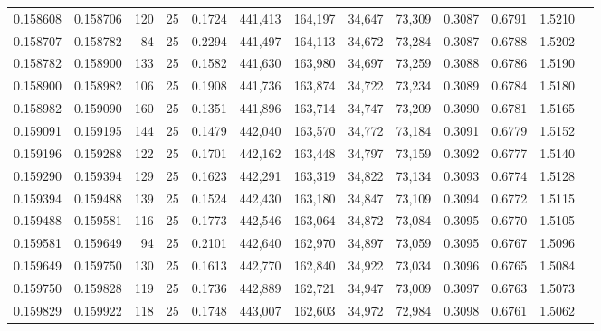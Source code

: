 \begin{tabular}{rrrrrrrrrrrrr}
0.158608 & 0.158706 &   120 &  25 &                                     0.1724 & 441,413 & 164,197 &  34,647 &  73,309 & 0.3087 & 0.6791 & 1.5210 \\
0.158707 & 0.158782 &    84 &  25 &                                     0.2294 & 441,497 & 164,113 &  34,672 &  73,284 & 0.3087 & 0.6788 & 1.5202 \\
0.158782 & 0.158900 &   133 &  25 &                                     0.1582 & 441,630 & 163,980 &  34,697 &  73,259 & 0.3088 & 0.6786 & 1.5190 \\
0.158900 & 0.158982 &   106 &  25 &                                     0.1908 & 441,736 & 163,874 &  34,722 &  73,234 & 0.3089 & 0.6784 & 1.5180 \\
0.158982 & 0.159090 &   160 &  25 &                                     0.1351 & 441,896 & 163,714 &  34,747 &  73,209 & 0.3090 & 0.6781 & 1.5165 \\
0.159091 & 0.159195 &   144 &  25 &                                     0.1479 & 442,040 & 163,570 &  34,772 &  73,184 & 0.3091 & 0.6779 & 1.5152 \\
0.159196 & 0.159288 &   122 &  25 &                                     0.1701 & 442,162 & 163,448 &  34,797 &  73,159 & 0.3092 & 0.6777 & 1.5140 \\
0.159290 & 0.159394 &   129 &  25 &                                     0.1623 & 442,291 & 163,319 &  34,822 &  73,134 & 0.3093 & 0.6774 & 1.5128 \\
0.159394 & 0.159488 &   139 &  25 &                                     0.1524 & 442,430 & 163,180 &  34,847 &  73,109 & 0.3094 & 0.6772 & 1.5115 \\
0.159488 & 0.159581 &   116 &  25 &                                     0.1773 & 442,546 & 163,064 &  34,872 &  73,084 & 0.3095 & 0.6770 & 1.5105 \\
0.159581 & 0.159649 &    94 &  25 &                                     0.2101 & 442,640 & 162,970 &  34,897 &  73,059 & 0.3095 & 0.6767 & 1.5096 \\
0.159649 & 0.159750 &   130 &  25 &                                     0.1613 & 442,770 & 162,840 &  34,922 &  73,034 & 0.3096 & 0.6765 & 1.5084 \\
0.159750 & 0.159828 &   119 &  25 &                                     0.1736 & 442,889 & 162,721 &  34,947 &  73,009 & 0.3097 & 0.6763 & 1.5073 \\
0.159829 & 0.159922 &   118 &  25 &                                     0.1748 & 443,007 & 162,603 &  34,972 &  72,984 & 0.3098 & 0.6761 & 1.5062 \\

\end{tabular}
